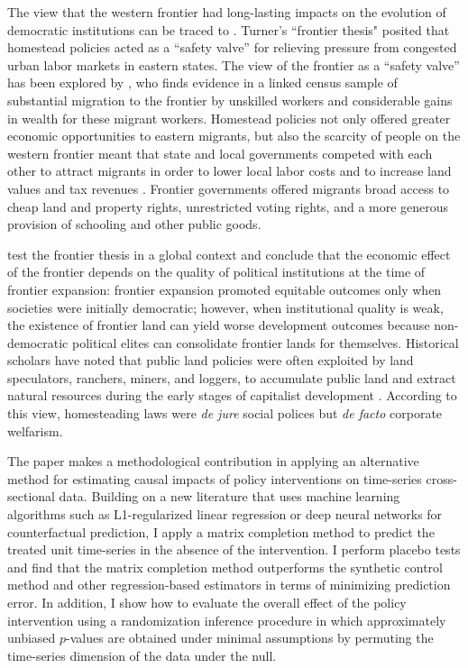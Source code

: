 \documentclass[12pt]{article}
\begin{document}
The view that the western frontier had long-lasting impacts on the evolution of democratic institutions can be traced to \citet{turner1956significance}. Turner's ``frontier thesis" posited that homestead policies acted as a ``safety valve'' for relieving pressure from congested urban labor markets in eastern states. The view of the frontier as a ``safety valve'' has been explored by \citet{ferrie1997migration}, who finds evidence in a linked census sample of substantial migration to the frontier by unskilled workers and considerable gains in wealth for these migrant workers. Homestead policies not only offered greater economic opportunities to eastern migrants, but also the scarcity of people on the western frontier meant that state and local governments competed with each other to attract migrants in order to lower local labor costs and to increase land values and tax revenues \citep{engerman2005evolution}. Frontier governments offered migrants broad access to cheap land and property rights, unrestricted voting rights, and a more generous provision of schooling and other public goods.%

\citet{garcia2009myth} test the frontier thesis in a global context and conclude that the economic effect of the frontier depends on the quality of political institutions at the time of frontier expansion: frontier expansion promoted equitable outcomes only when societies were initially democratic; however, when institutional quality is weak, the existence of frontier land can yield worse development outcomes because non-democratic political elites can consolidate frontier lands for themselves. Historical scholars have noted that public land policies were often exploited by land speculators, ranchers, miners, and loggers, to accumulate public land and extract natural resources during the early stages of capitalist development \citep{gates1942role,murtazashvili2013political}. According to this view, homesteading laws were \emph{de jure} social polices but \emph{de facto} corporate welfarism. 

The paper makes a methodological contribution in applying an alternative method for estimating causal impacts of policy interventions on time-series cross-sectional data. Building on a new literature that uses machine learning algorithms such as L1-regularized linear regression \citep{doudchenko2016balancing} or deep neural networks \citep{poulos2017rnn} for counterfactual prediction, I apply a matrix completion method to predict the treated unit time-series in the absence of the intervention. I perform placebo tests and find that the matrix completion method outperforms the synthetic control method and other regression-based estimators in terms of minimizing prediction error. In addition, I show how to evaluate the overall effect of the policy intervention using a randomization inference procedure in which approximately unbiased $p$-values are obtained under minimal assumptions by permuting the time-series dimension of the data under the null.
\end{document}
